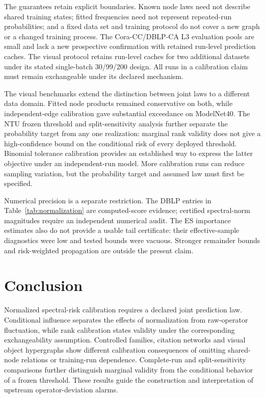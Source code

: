 The guarantees retain explicit boundaries. Known node laws need not
describe shared training states; fitted frequencies need not represent
repeated-run probabilities; and a fixed data set and training protocol
do not cover a new graph or a changed training process. The
Cora-CC/DBLP-CA L3 evaluation pools are small and lack a new
prospective confirmation with retained run-level prediction caches.
The visual protocol retains run-level caches for two additional
datasets under its stated single-batch 30/99/200 design. All runs in
a calibration claim must remain exchangeable under its declared
mechanism.

The visual benchmarks extend the distinction between joint laws to a
different data domain. Fitted node products remained conservative on
both, while independent-edge calibration gave substantial
exceedance on ModelNet40. The NTU frozen threshold and split-sensitivity
analysis further separate the probability target from any one
realization: marginal rank validity does not give a high-confidence
bound on the conditional risk of every deployed threshold. Binomial
tolerance calibration provides an established way to express the
latter objective under an independent-run model. More calibration
runs can reduce sampling variation, but the probability target and
assumed law must first be specified.

Numerical precision is a separate restriction. The DBLP entries in
Table~\ref{tab:normalization} are computed-score evidence; certified
spectral-norm magnitudes require an independent numerical audit. The ES
importance estimates also do not provide a usable tail certificate:
their effective-sample diagnostics were low and tested bounds were
vacuous. Stronger remainder bounds and risk-weighted propagation are
outside the present claim.

\section{Conclusion}\label{sec:conclusion}
Normalized spectral-risk calibration requires a declared joint
prediction law. Conditional influence separates the effects of
normalization from raw-operator fluctuation, while rank calibration
states validity under the corresponding exchangeability assumption.
Controlled families, citation networks and visual object hypergraphs
show different calibration consequences of omitting shared-node
relations or training-run dependence. Complete-run and split-sensitivity
comparisons further distinguish marginal validity from the conditional
behavior of a frozen threshold. These results guide the construction
and interpretation of upstream operator-deviation alarms.
